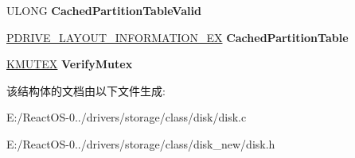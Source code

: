 \begin{DoxyCompactItemize}
U\+L\+O\+NG {\bfseries Cached\+Partition\+Table\+Valid}
\item 
\mbox{\label{struct___d_i_s_k___d_a_t_a_a2166bdcff7676fa2eea9cfbdcdac6077}} 
\hyperlink{struct___d_r_i_v_e___l_a_y_o_u_t___i_n_f_o_r_m_a_t_i_o_n___e_x}{P\+D\+R\+I\+V\+E\+\_\+\+L\+A\+Y\+O\+U\+T\+\_\+\+I\+N\+F\+O\+R\+M\+A\+T\+I\+O\+N\+\_\+\+EX} {\bfseries Cached\+Partition\+Table}
\item 
\mbox{\label{struct___d_i_s_k___d_a_t_a_ac26bf6ea6d915d7e71b1d83d225fa209}} 
\hyperlink{struct___k_m_u_t_a_n_t}{K\+M\+U\+T\+EX} {\bfseries Verify\+Mutex}
\end{DoxyCompactItemize}


该结构体的文档由以下文件生成\+:\begin{DoxyCompactItemize}
\item 
E\+:/\+React\+O\+S-\/0../drivers/storage/class/disk/disk.\+c\item 
E\+:/\+React\+O\+S-\/0../drivers/storage/class/disk\+\_\+new/disk.\+h\end{DoxyCompactItemize}
